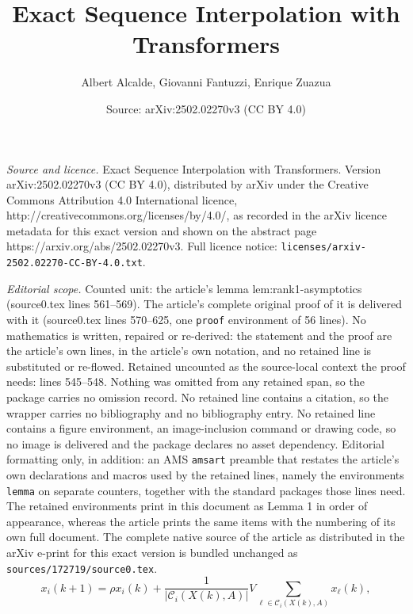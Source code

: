 \documentclass[10pt,a4paper]{amsart}
\title{Exact Sequence Interpolation with Transformers}
\author{Albert Alcalde, Giovanni Fantuzzi, Enrique Zuazua}
\date{Source: arXiv:2502.02270v3 (CC BY 4.0)}
\begin{document}
\maketitle

\noindent\emph{Source and licence.} Exact Sequence Interpolation with Transformers. Version arXiv:2502.02270v3 (CC BY 4.0), distributed by arXiv under the Creative Commons Attribution 4.0 International licence, http://creativecommons.org/licenses/by/4.0/, as recorded in the arXiv licence metadata for this exact version and shown on the abstract page https://arxiv.org/abs/2502.02270v3. Full licence notice: \texttt{licenses/arxiv-2502.02270-CC-BY-4.0.txt}.\par\smallskip

\noindent\textit{Editorial scope.} Counted unit: the article's lemma lem:rank1-asymptotics (source0.tex lines 561--569). The article's complete original proof of it is delivered with it (source0.tex lines 570--625, one \texttt{proof} environment of 56 lines). No mathematics is written, repaired or re-derived: the statement and the proof are the article's own lines, in the article's own notation, and no retained line is substituted or re-flowed.  Retained uncounted as the source-local context the proof needs: lines 545--548.  Nothing was omitted from any retained span, so the package carries no omission record.  No retained line contains a citation, so the wrapper carries no bibliography and no bibliography entry.  No retained line contains a figure environment, an image-inclusion command or drawing code, so no image is delivered and the package declares no asset dependency.  Editorial formatting only, in addition: an AMS \texttt{amsart} preamble that restates the article's own declarations and macros used by the retained lines, namely the environments \texttt{lemma} on separate counters, together with the standard packages those lines need.  The retained environments print in this document as Lemma 1 in order of appearance, whereas the article prints the same items with the numbering of its own full document.  The complete native source of the article as distributed in the arXiv e-print for this exact version is bundled unchanged as \texttt{sources/172719/source0.tex}.
\begin{equation}\label{eq:hardmaxDynamics}
    x_i(k+1) = \rho x_i(k) + \frac{1}{|\mathcal{C}_i(X(k), A)|} V
        \sum_{\ell \in \mathcal{C}_i(X(k), A)} x_\ell(k),
\end{equation}
\end{document}
